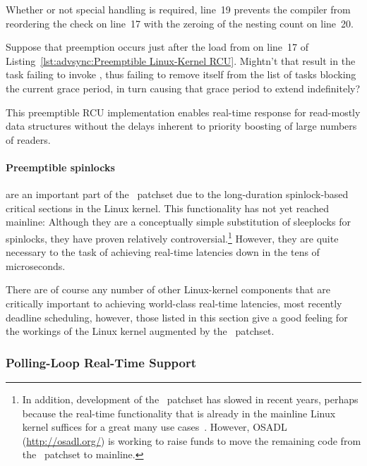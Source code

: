Whether or not special handling is required, line~19 prevents the compiler
from reordering the check on line~17 with the zeroing of the nesting
count on line~20.

\QuickQuiz{}
	Suppose that preemption occurs just after the load from
	 on line~17 of
	Listing~\ref{lst:advsync:Preemptible Linux-Kernel RCU}.
	Mightn't that result in the task failing to invoke
	, thus failing to remove itself
	from the list of tasks blocking the current grace period,
	in turn causing that grace period to extend indefinitely?
 \QuickQuizEnd

This preemptible RCU implementation enables real-time response for
read-mostly data structures without the delays inherent to priority
boosting of large numbers of readers.

\paragraph{Preemptible spinlocks}
are an important part of the \rt\ patchset due to the long-duration
spinlock-based critical sections in the Linux kernel.
This functionality has not yet reached mainline: Although they are a conceptually
simple substitution of sleeplocks for spinlocks, they have proven relatively
controversial.\footnote{
	In addition, development of the \rt\ patchset has slowed in recent
	years, perhaps because the real-time functionality that is already
	in the mainline Linux kernel suffices for a great many use
	cases~\cite{JakeEdge2013Future-rtLinux,JakeEdge2014Future-rtLinux}.
	However, OSADL (\url{http://osadl.org/}) is working to raise funds
	to move the remaining code from the \rt\ patchset to mainline.}
However, they are quite necessary to the task of achieving real-time
latencies down in the tens of microseconds.

There are of course any number of other Linux-kernel components that are
critically important to achieving world-class real-time latencies,
most recently deadline scheduling,
however, those listed in this section give a good feeling for the workings
of the Linux kernel augmented by the \rt\ patchset.

\subsubsection{Polling-Loop Real-Time Support}
\label{sec:advsync:Polling-Loop Real-Time Support}

